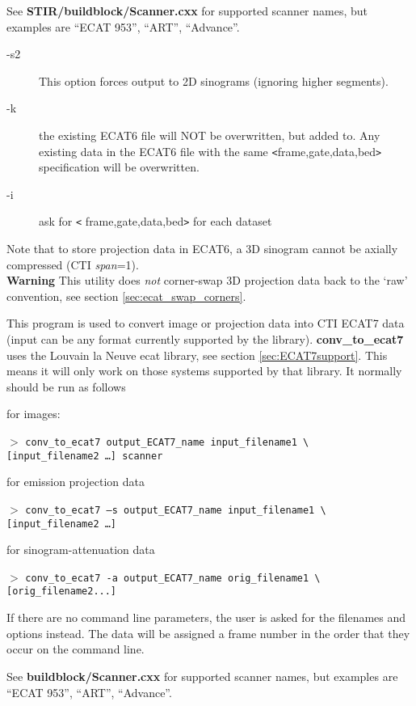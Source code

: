 \documentclass{article}
\newcommand{\tab}{\hspace{5mm}}
\newcommand{\cmdline}[1]{\par \noindent $>$ \texttt{#1}\par}
\begin{document}
See \textbf{STIR/buildblock/Scanner.cxx} for supported scanner names, 
but examples are ``ECAT 953'', ``ART'', 
``Advance''. 


{ 
}\begin{description}
\item[-s2] This option forces output to 2D sinograms (ignoring higher 
segments).
\item[-k] the existing ECAT6 file will NOT be overwritten, but added 
to. Any existing data in the ECAT6 file with the same \texttt{<}frame,gate,data,bed\texttt{>} 
specification will be overwritten.
\item[-i] ask for \texttt{<} frame,gate,data,bed\texttt{>} for each dataset
\end{description}

Note that to store projection data in ECAT6, a 3D sinogram cannot 
be axially compressed (CTI \textit{span}=1).\\
\textbf{Warning} This utility does \textit{not} corner-swap 3D projection 
data back to the `raw' convention, see section \ref{sec:ecat_swap_corners}.

{ 
}

This program is used to convert image or projection data into 
CTI ECAT7 data (input can be any format currently supported by 
the library). \textbf{conv\_to\_ecat7} uses the Louvain la Neuve ecat 
library, see section \ref{sec:ECAT7support}. This means it will only work on those 
systems supported by that library. It normally should be run 
as follows


for images:
\cmdline{conv\_to\_ecat7 output\_ECAT7\_name input\_filename1 {\textbackslash}\\
{[}input\_filename2 \dots ] scanner}


for emission projection data
\cmdline{conv\_to\_ecat7 --s output\_ECAT7\_name input\_filename1 {\textbackslash}\\
{[}input\_filename2 \dots ]\tab  }


for sinogram-attenuation data
\cmdline{conv\_to\_ecat7 -a output\_ECAT7\_name orig\_filename1 {\textbackslash}\\
{[}orig\_filename2...]}


If there are no command line parameters, the user is asked for 
the filenames and options instead. The data will be assigned 
a frame number in the order that they occur on the command line.


See \textbf{buildblock/Scanner.cxx} for supported scanner names, but 
examples are ``ECAT 953'', ``ART'', ``Advance''. 
\end{document}
